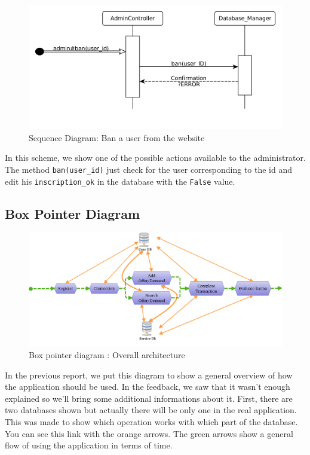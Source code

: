\begin{figure}[H]
	\begin{center}
		\includegraphics[width=.55\textwidth]{ban_user.png}
		\caption{Sequence Diagram: Ban a user from the website}
		\label{fig:ban}
	\end{center}
\end{figure}

In this scheme, we show one of the possible actions available to the administrator.
The method \texttt{ban(user\_id)} just check for the user corresponding to the id and edit his \texttt{inscription\_ok} in the database with the \texttt{False} value.


\subsection{Box Pointer Diagram}
 \begin{figure}[H]
	\begin{center}
		\includegraphics[width=.8\textwidth]{boxpointer.png}
		\caption{Box pointer diagram : Overall architecture}
		\label{fig:boxpointer}
	\end{center}
\end{figure}

In the previous report, we put this diagram to show a general overview of how the application should be used. In the feedback, we saw that it wasn't enough explained so we'll bring some additional informations about it. First, there are two databases shown but actually there will be only one in the real application. This was made to show which operation works with which part of the database. You can see this link with the orange arrows. The green arrows show a general flow of using the application in terms of time.
